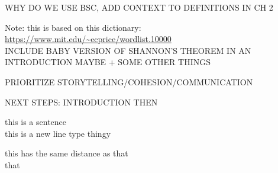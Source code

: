WHY DO WE USE BSC, ADD CONTEXT TO DEFINITIONS IN CH 2



Note: this is based on this dictionary: \url{https://www.mit.edu/~ecprice/wordlist.10000}  \\



INCLUDE BABY VERSION OF SHANNON'S THEOREM IN AN INTRODUCTION MAYBE + SOME OTHER THINGS


PRIORITIZE STORYTELLING/COHESION/COMMUNICATION

NEXT STEPS: INTRODUCTION THEN 





\newpage

this is a sentence\\

this is a new line type thingy

this has the same distance as that\\
that



